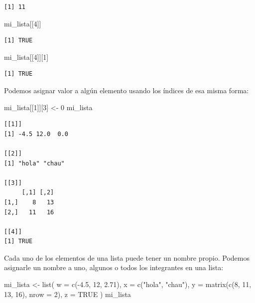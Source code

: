 \documentclass[
]{book}
\newenvironment{Shaded}{\begin{snugshade}}{\end{snugshade}}
\newcommand{\AttributeTok}[1]{\textcolor[rgb]{0.77,0.63,0.00}{#1}}
\newcommand{\ConstantTok}[1]{\textcolor[rgb]{0.00,0.00,0.00}{#1}}
\newcommand{\DecValTok}[1]{\textcolor[rgb]{0.00,0.00,0.81}{#1}}
\newcommand{\FloatTok}[1]{\textcolor[rgb]{0.00,0.00,0.81}{#1}}
\newcommand{\FunctionTok}[1]{\textcolor[rgb]{0.00,0.00,0.00}{#1}}
\newcommand{\NormalTok}[1]{#1}
\newcommand{\OtherTok}[1]{\textcolor[rgb]{0.56,0.35,0.01}{#1}}
\newcommand{\SpecialCharTok}[1]{\textcolor[rgb]{0.00,0.00,0.00}{#1}}
\newcommand{\StringTok}[1]{\textcolor[rgb]{0.31,0.60,0.02}{#1}}
\begin{document}
\begin{verbatim}
[1] 11
\end{verbatim}

\begin{Shaded}
\begin{Highlighting}[]
\NormalTok{mi\_lista[[}\DecValTok{4}\NormalTok{]]}
\end{Highlighting}
\end{Shaded}

\begin{verbatim}
[1] TRUE
\end{verbatim}

\begin{Shaded}
\begin{Highlighting}[]
\NormalTok{mi\_lista[[}\DecValTok{4}\NormalTok{]][}\DecValTok{1}\NormalTok{]}
\end{Highlighting}
\end{Shaded}

\begin{verbatim}
[1] TRUE
\end{verbatim}

Podemos asignar valor a algún elemento usando los índices de esa misma forma:

\begin{Shaded}
\begin{Highlighting}[]
\NormalTok{mi\_lista[[}\DecValTok{1}\NormalTok{]][}\DecValTok{3}\NormalTok{] }\OtherTok{\textless{}{-}} \DecValTok{0}
\NormalTok{mi\_lista}
\end{Highlighting}
\end{Shaded}

\begin{verbatim}
[[1]]
[1] -4.5 12.0  0.0

[[2]]
[1] "hola" "chau"

[[3]]
     [,1] [,2]
[1,]    8   13
[2,]   11   16

[[4]]
[1] TRUE
\end{verbatim}

Cada uno de los elementos de una lista puede tener un nombre propio. Podemos asignarle un nombre a uno, algunos o todos los integrantes en una lista:

\begin{Shaded}
\begin{Highlighting}[]
\NormalTok{mi\_lista }\OtherTok{\textless{}{-}} \FunctionTok{list}\NormalTok{(}
    \AttributeTok{w =} \FunctionTok{c}\NormalTok{(}\SpecialCharTok{{-}}\FloatTok{4.5}\NormalTok{, }\DecValTok{12}\NormalTok{, }\FloatTok{2.71}\NormalTok{),}
    \AttributeTok{x =} \FunctionTok{c}\NormalTok{(}\StringTok{"hola"}\NormalTok{, }\StringTok{"chau"}\NormalTok{),}
    \AttributeTok{y =} \FunctionTok{matrix}\NormalTok{(}\FunctionTok{c}\NormalTok{(}\DecValTok{8}\NormalTok{, }\DecValTok{11}\NormalTok{, }\DecValTok{13}\NormalTok{, }\DecValTok{16}\NormalTok{), }\AttributeTok{nrow =} \DecValTok{2}\NormalTok{),}
    \AttributeTok{z =} \ConstantTok{TRUE}
\NormalTok{)}
\NormalTok{mi\_lista}
\end{Highlighting}
\end{Shaded}
\end{document}
